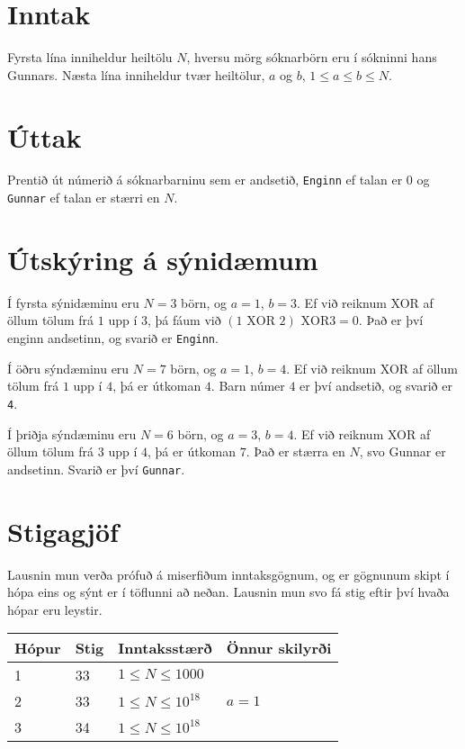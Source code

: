 \section*{Inntak}
Fyrsta lína inniheldur heiltölu $N$, hversu mörg sóknarbörn eru í sókninni hans Gunnars.
Næsta lína inniheldur tvær heiltölur, $a$ og $b$, $1 \leq a \leq b \leq  N$.

\section*{Úttak}
Prentið út númerið á sóknarbarninu sem er andsetið, \texttt{Enginn} ef talan er $0$ og
\texttt{Gunnar} ef talan er stærri en $N$.

\section*{Útskýring á sýnidæmum}
Í fyrsta sýnidæminu eru $N = 3$ börn, og $a = 1$, $b = 3$. Ef við reiknum XOR
af öllum tölum frá $1$ upp í $3$, þá fáum við $(1\textrm{ XOR  }2)\textrm{ XOR
}3 = 0$. Það er því enginn andsetinn, og svarið er \texttt{Enginn}.

Í öðru sýndæminu eru $N = 7$ börn, og $a = 1$, $b = 4$. Ef við reiknum XOR af öllum tölum frá $1$ upp í
$4$, þá er útkoman $4$. Barn númer $4$ er því andsetið, og svarið er \texttt{4}.

Í þriðja sýndæminu eru $N = 6$ börn, og $a = 3$, $b = 4$. Ef við reiknum XOR af öllum tölum frá $3$ upp í
$4$, þá er útkoman $7$. Það er stærra en $N$, svo Gunnar er andsetinn. Svarið er því \texttt{Gunnar}.

\section*{Stigagjöf}
Lausnin mun verða prófuð á miserfiðum inntaksgögnum, og er gögnunum skipt í
hópa eins og sýnt er í töflunni að neðan. Lausnin mun svo fá stig eftir því
hvaða hópar eru leystir.

\begin{tabular}{|l|l|l|l|}
\hline
Hópur & Stig & Inntaksstærð & Önnur skilyrði \\ \hline
1     & 33         & $ 1 \le N \le 1000$ &   \\ \hline
2     & 33         & $ 1 \le N \le 10^{18}$ & $a = 1$  \\ \hline
3     & 34         & $ 1 \le N \le 10^{18}$ & \\ \hline
\end{tabular}

